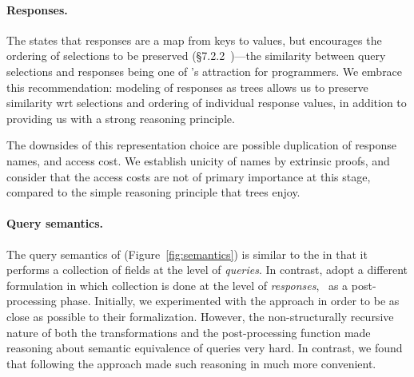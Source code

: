 \paragraph{Responses.}
The \spec states that responses are a map from keys to values, but encourages the ordering of selections to be preserved (\cf\S7.2.2~\cite{gqlspec})---the similarity between query selections and responses being one of \gql's attraction for programmers.  We embrace this recommendation: modeling of responses as trees allows us to preserve similarity wrt selections and ordering of individual response values, in addition to providing us with a strong reasoning principle.

The downsides of this representation choice are possible duplication of response names, and access cost. We establish unicity of names by extrinsic proofs, and consider that the access costs are not of primary importance at this stage, compared to the simple reasoning principle that trees enjoy.



\paragraph{Query semantics.}
\mbox{}

The query semantics of \gcoql (Figure~\ref{fig:semantics}) is similar to the \spec in that it performs a collection of fields at the level of {\em queries}. In contrast, \HP adopt a different formulation in which collection is done at the level of {\em responses}, \ie~as a post-processing phase. Initially, we experimented with the \HP approach in order to be as close as possible to their formalization. However, the non-structurally recursive nature of both the transformations and the post-processing function made reasoning about semantic equivalence of queries very hard. In contrast, we found that following the \spec approach made such reasoning in \coq much more convenient. 

